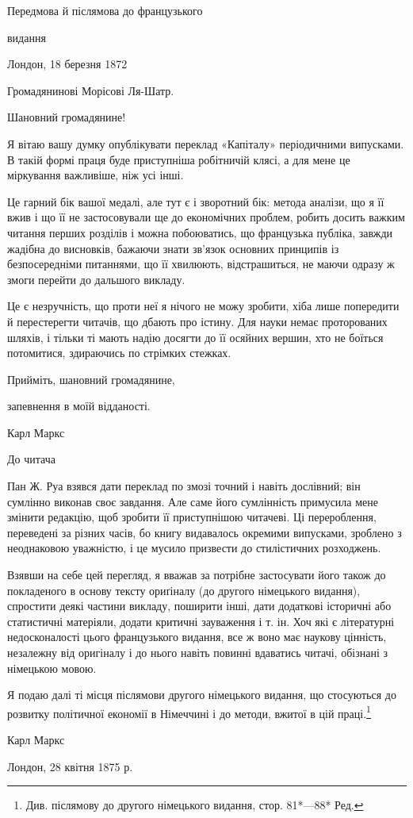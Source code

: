 Передмова й післямова до французького

видання

Лондон, 18 березня 1872

Громадянинові Морісові Ля-Шатр.

Шановний громадянине!

Я вітаю вашу думку опублікувати переклад «Капіталу» періодичними
випусками. В такій формі праця буде приступніша
робітничій клясі, а для мене це міркування важливіше, ніж
усі інші.

Це гарний бік вашої медалі, але тут є і зворотний бік: метода
аналізи, що я її вжив і що її не застосовували ще до економічних
проблем, робить досить важким читання перших розділів і можна
побоюватись, що французька публіка, завжди жадібна до висновків,
бажаючи знати зв’язок основних принципів із безпосередніми
питаннями, що її хвилюють, відстрашиться, не маючи одразу ж
змоги перейти до дальшого викладу.

Це є незручність, що проти неї я нічого не можу зробити, хіба
лише попередити й перестерегти читачів, що дбають про істину.
Для науки немає проторованих шляхів, і тільки ті мають надію
досягти до її осяйних вершин, хто не боїться потомитися, здираючись
по стрімких стежках.

Прийміть, шановний громадянине,

запевнення в моїй відданості.

Карл Маркс

До читача

Пан Ж. Руа взявся дати переклад по змозі точний і навіть
дослівний; він сумлінно виконав своє завдання. Але саме його
сумлінність примусила мене змінити редакцію, щоб зробити її
приступнішою читачеві. Ці перероблення, переведені за різних
часів, бо книгу видавалось окремими випусками, зроблено з
неоднаковою уважністю, і це мусило призвести до стилістичних
розходжень.

Взявши на себе цей перегляд, я вважав за потрібне застосувати
його також до покладеного в основу тексту ориґіналу (до другого
німецького видання), спростити деякі частини викладу, поширити
інші, дати додаткові історичні або статистичні матеріяли, додати
критичні зауваження і т. ін. Хоч які є літературні недосконалості
цього французького видання, все ж воно має наукову цінність,
незалежну від оригіналу і до нього навіть повинні вдаватись
читачі, обізнані з німецькою мовою.

Я подаю далі ті місця післямови другого німецького видання,
що стосуються до розвитку політичної економії в Німеччині і до
методи, вжитої в цій праці.\footnote*{
Див. післямову до другого німецького видання, стор. 81*—88* Ред.
}

Карл Маркс

Лондон, 28 квітня 1875 р.
